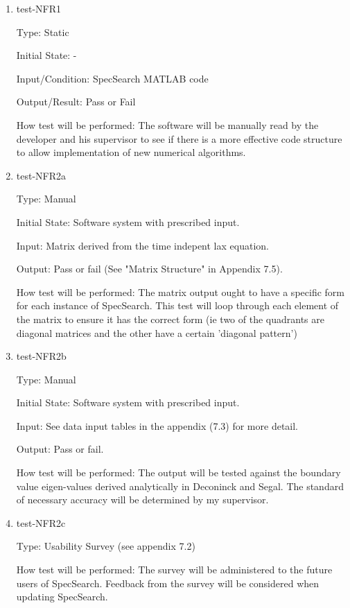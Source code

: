 \documentclass[12pt, titlepage]{article}
\begin{document}
\begin{enumerate}

\item{test-NFR1\\}

Type: Static
					
Initial State: -
					
Input/Condition: SpecSearch MATLAB code
					
Output/Result: Pass or Fail
					
How test will be performed: The software will be manually read by the developer 
and his supervisor to see if there is a more effective code structure to allow 
implementation of new numerical algorithms. 

\item{test-NFR2a\\} 

Type: Manual 

Initial State: Software system with prescribed input.

Input: Matrix derived from the time indepent lax equation.

Output: Pass or fail (See "Matrix Structure" in Appendix 7.5).

How test will be performed: The matrix output ought to have a specific form for 
each instance of SpecSearch. This test will loop through each element of the 
matrix to ensure it has the correct form (ie two of the quadrants are diagonal 
matrices and the other have a certain 'diagonal pattern') 

\item{test-NFR2b\\} 

Type: Manual 

Initial State: Software system with prescribed input.

Input: See data input tables in the appendix (7.3) for more detail.

Output: Pass or fail.

How test will be performed: The output will be tested against the boundary 
value eigen-values derived analytically in Deconinck and Segal. The standard of 
necessary accuracy will be determined by my supervisor. \\ 

\item{test-NFR2c\\} 

Type: Usability Survey (see appendix 7.2) 

How test will be performed: The survey will be administered to the future users 
of SpecSearch. Feedback from the survey will be considered when updating 
SpecSearch. 

\end{enumerate}
\end{document}
